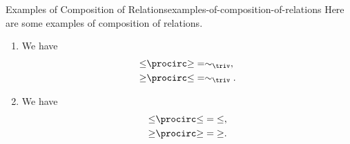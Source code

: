\begin{example}{Examples of Composition of Relations}{examples-of-composition-of-relations}%
    Here are some examples of composition of relations.
    \begin{enumerate}
        \item\label{examples-of-composition-of-relations-1}We have
            \begin{align*}
                \mathord{\leq}\procirc\mathord{\geq} &= \sim_{\triv},\\
                \mathord{\geq}\procirc\mathord{\leq} &= \sim_{\triv}.
            \end{align*}
        \item\label{examples-of-composition-of-relations-2}We have
            \begin{align*}
                \mathord{\leq}\procirc\mathord{\leq} &= \mathord{\leq},\\
                \mathord{\geq}\procirc\mathord{\geq} &= \mathord{\geq}.
            \end{align*}
    \end{enumerate}
\end{example}
